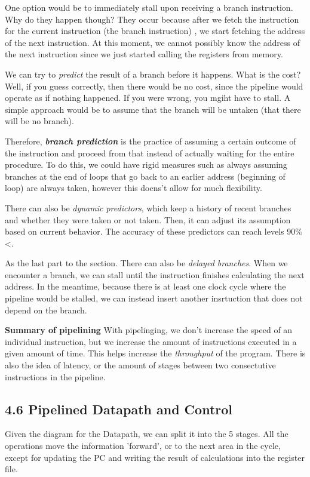 \documentclass{article}
\begin{document}
One option would be to immediately stall upon receiving a branch instruction. Why do they happen though?
They occur because after we fetch the instruction for the current instruction (the branch instruction)
, we start fetching the address of the next instruction. At this moment, we cannot possibly know the
address of the next instruction since we just started calling the registers from memory.

We can try to \textit{predict} the result of a branch before it happens. What is the cost? Well, if
you guess correctly, then there would be no cost, since the pipeline would operate as if nothing 
happened. If you were wrong, you mgiht have to stall. A simple approach 
would be to assume that the branch will be untaken (that there will be no branch).

Therefore, \textit{\textbf{branch prediction}} is the practice of assuming a certain outcome of the
instruction and proceed from that instead of actually waiting for the entire procedure. To do this,
we could have rigid measures such as always assuming branches at the end of loops that go back 
to an earlier address (beginning of loop) are always taken, however this doens't allow for
much flexibility. 

There can also be \textit{dynamic predictors}, which keep a history of recent branches and 
whether they were taken or not taken. Then, it can adjust its assumption based on current
behavior. The accuracy of these predictors can reach levels 90\%<.

As the last part to the section. There can also be \textit{delayed branches}. When we 
encounter a branch, we can stall until the instruction finishes calculating the next
address. In the meantime, because there is at least one clock cycle where the pipeline
would be stalled, we can instead insert another insrtuction that does not depend on
the branch.

\hspace{10mm}\textbf{Summary of pipelining}
With pipelinging, we don't increase the speed of an individual instruction, but we 
increase the amount of instructions executed in a given amount of time. This helps
increase the \textit{throughput} of the program. There is also the idea of latency, 
or the amount of stages between two consectutive instructions in the pipeline.
\subsection{4.6 Pipelined Datapath and Control}
Given the diagram for the Datapath, we can split it into the 5 stages. All the 
operations move the information 'forward', or to the next area in the cycle, 
except for updating the PC and writing the result of calculations into the 
register file.
\end{document}
